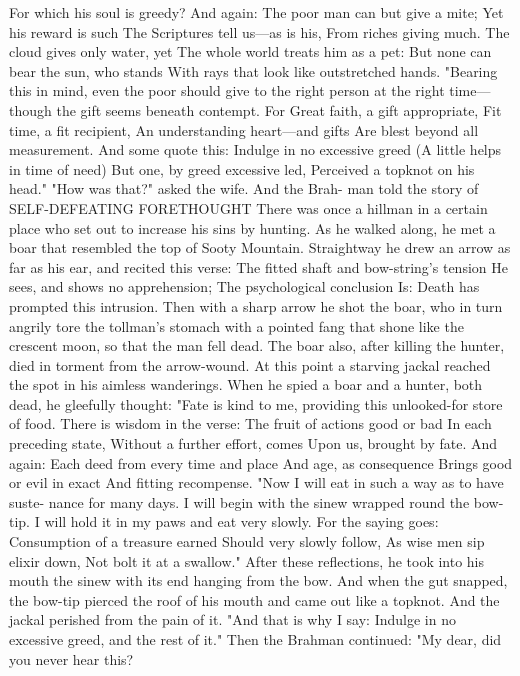 \documentclass{book}
\begin{document}
For which his soul is greedy?
And again:
The poor man can but give a mite;
Yet his reward is such
The Scriptures tell us---as is his,
From riches giving much.
The cloud gives only water, yet
The whole world treats him as a pet:
But none can bear the sun, who stands
With rays that look like outstretched hands.
"Bearing this in mind, even the poor should give
to the right person at the right time---though the gift
seems beneath contempt. For
Great faith, a gift appropriate,
Fit time, a fit recipient,
An understanding heart---and gifts
Are blest beyond all measurement.
And some quote this:
Indulge in no excessive greed
(A little helps in time of need)
But one, by greed excessive led,
Perceived a topknot on his head."
"How was that?" asked the wife. And the Brah-
man told the story of
SELF-DEFEATING FORETHOUGHT
There was once a hillman in a certain place who
set out to increase his sins by hunting. As he walked
along, he met a boar that resembled the top of Sooty
Mountain. Straightway he drew an arrow as far as
his ear, and recited this verse:
The fitted shaft and bow-string's tension
He sees, and shows no apprehension;
The psychological conclusion
Is: Death has prompted this intrusion.
Then with a sharp arrow he shot the boar, who in
turn angrily tore the tollman's stomach with a
pointed fang that shone like the crescent moon, so
that the man fell dead. The boar also, after killing the
hunter, died in torment from the arrow-wound.
At this point a starving jackal reached the spot in
his aimless wanderings. When he spied a boar and a
hunter, both dead, he gleefully thought: "Fate is
kind to me, providing this unlooked-for store of food.
There is wisdom in the verse:
The fruit of actions good or bad
In each preceding state,
Without a further effort, comes
Upon us, brought by fate.
And again:
Each deed from every time and place
And age, as consequence
Brings good or evil in exact
And fitting recompense.
"Now I will eat in such a way as to have suste-
nance for many days. I will begin with the sinew
wrapped round the bow-tip. I will hold it in my paws
and eat very slowly. For the saying goes:
Consumption of a treasure earned
Should very slowly follow,
As wise men sip elixir down,
Not bolt it at a swallow."
After these reflections, he took into his mouth the
sinew with its end hanging from the bow. And when
the gut snapped, the bow-tip pierced the roof of his
mouth and came out like a topknot. And the jackal
perished from the pain of it.
"And that is why I say:
Indulge in no excessive greed,
and the rest of it."
Then the Brahman continued: "My dear, did you
never hear this?
\end{document}
